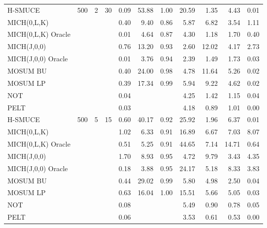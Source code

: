 \begin{table}
\begin{tabular}{l| r r r r r r r r r r}
        H-SMUCE & 500 & 2 & 30 & 0.09 & 53.88 & 1.00 & 20.59 & 1.35 & 4.43 & 0.01 \\
        MICH(0,L,K) &  &  &  & 0.40 & 9.40 & 0.86 & 5.87 & 6.82 & 3.54 & 1.11 \\
        MICH(0,L,K) Oracle &  &  &  & 0.01 & 4.64 & 0.87 & 4.30 & 1.18 & 1.70 & 0.40 \\
        MICH(J,0,0) &  &  &  & 0.76 & 13.20 & 0.93 & 2.60 & 12.02 & 4.17 & 2.73 \\
        MICH(J,0,0) Oracle &  &  &  & 0.01 & 3.76 & 0.94 & 2.39 & 1.49 & 1.73 & 0.03 \\
        MOSUM BU &  &  &  & 0.40 & 24.00 & 0.98 & 4.78 & 11.64 & 5.26 & 0.02 \\
        MOSUM LP &  &  &  & 0.39 & 17.34 & 0.99 & 5.94 & 9.22 & 4.62 & 0.02 \\
        NOT &  &  &  & 0.04 &  &  & 4.25 & 1.42 & 1.15 & 0.04 \\
        PELT &  &  &  & 0.03 &  &  & 4.18 & 0.89 & 1.01 & 0.00\\ \hline 

        H-SMUCE & 500 & 5 & 15 & 0.60 & 40.17 & 0.92 & 25.92 & 1.96 & 6.37 & 0.01 \\
        MICH(0,L,K) &  &  &  & 1.02 & 6.33 & 0.91 & 16.89 & 6.67 & 7.03 & 8.07 \\
        MICH(0,L,K) Oracle &  &  &  & 0.51 & 5.25 & 0.91 & 44.65 & 7.14 & 14.71 & 0.64 \\
        MICH(J,0,0) &  &  &  & 1.70 & 8.93 & 0.95 & 4.72 & 9.79 & 3.43 & 4.35 \\
        MICH(J,0,0) Oracle &  &  &  & 0.18 & 3.88 & 0.95 & 24.17 & 5.18 & 8.33 & 3.83 \\
        MOSUM BU &  &  &  & 0.44 & 29.02 & 0.99 & 5.80 & 4.98 & 2.50 & 0.04 \\
        MOSUM LP &  &  &  & 0.63 & 16.04 & 1.00 & 15.51 & 5.66 & 5.05 & 0.03 \\
        NOT &  &  &  & 0.08 &  &  & 5.49 & 0.90 & 0.78 & 0.05 \\
        PELT &  &  &  & 0.06 &  &  & 3.53 & 0.61 & 0.53 & 0.00\\ \hline 


\end{tabular}
\end{table}
